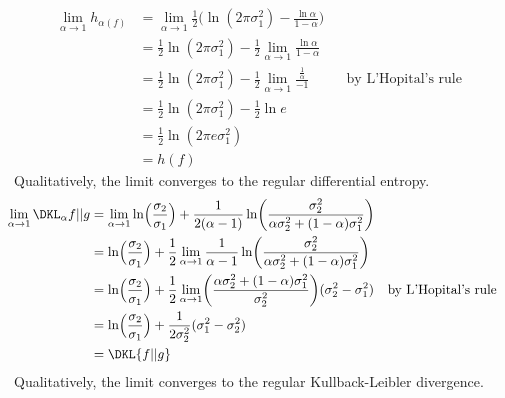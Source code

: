 \documentclass[
  coursecode={MTHE 474},
  assignmentname={Homework \homeworknumber},
  studentnumber=20053722,
  name={Bryan Hoang},
  draft,
]{
  ltxanswer%
}
\begin{document}
\begin{questions}
\begin{parts}
      \part{}
      \begin{solution}
        \begin{align*}
          \lim_{\alpha\to1} h_{\alpha(f)} &= \lim_{\alpha\to1} \frac{1}{2}\biggl(\ln(2\pi\sigma_{1}^{2}) - \frac{\ln\alpha}{1-\alpha}\biggr)                               \\
                                          &= \frac{1}{2} \ln(2\pi\sigma_{1}^{2}) - \frac{1}{2} \lim_{\alpha\to1} \frac{\ln\alpha}{1-\alpha}                                \\
                                          &= \frac{1}{2} \ln(2\pi\sigma_{1}^{2}) - \frac{1}{2} \lim_{\alpha\to1} \frac{\frac{1}{\alpha}}{-1} & &\text{by L'Hopital's rule} \\
                                          &= \frac{1}{2} \ln(2\pi\sigma_{1}^{2}) - \frac{1}{2} \ln e                                                                       \\
                                          &= \frac{1}{2} \ln(2\pi e\sigma_{1}^{2})                                                                                         \\
                                          &= h(f)
        \end{align*}
        \therefore\ Qualitatively, the limit converges to the regular differential entropy.
        \begin{align*}
          \lim_{\alpha\to1} \DKL_{\alpha}{f||g} &= \lim_{\alpha\to1} \ln\Bigl(\frac{\sigma_{2}}{\sigma_{1}}\Bigr) + \frac{1}{2(\alpha-1)} \ln \biggl(\frac{\sigma_{2}^{2}}{\alpha\sigma_{2}^{2}+(1-\alpha)\sigma_{1}^{2}}\biggr)                                                \\
                                                &= \ln\Bigl(\frac{\sigma_{2}}{\sigma_{1}}\Bigr) + \frac{1}{2} \lim_{\alpha\to1} \frac{1}{\alpha-1} \ln \biggl(\frac{\sigma_{2}^{2}}{\alpha\sigma_{2}^{2}+(1-\alpha)\sigma_{1}^{2}}\biggr)                                       \\
                                                &= \ln\Bigl(\frac{\sigma_{2}}{\sigma_{1}}\Bigr) + \frac{1}{2} \lim_{\alpha\to1} \biggl(\frac{\alpha\sigma_{2}^{2}+(1-\alpha)\sigma_{1}^{2}}{\sigma_{2}^{2}}\biggr)(\sigma_{2}^{2}-\sigma_{1}^{2}) & &\text{by L'Hopital's rule} \\
                                                &= \ln\Bigl(\frac{\sigma_{2}}{\sigma_{1}}\Bigr) + \frac{1}{2\sigma_{2}^{2}}(\sigma_{1}^{2}-\sigma_{2}^{2})                                                                                                                      \\
                                                &= \DKL{f||g}
        \end{align*}
        \therefore\ Qualitatively, the limit converges to the regular Kullback-Leibler divergence.
      \end{solution}
    \end{parts}
  \end{questions}
\end{document}

